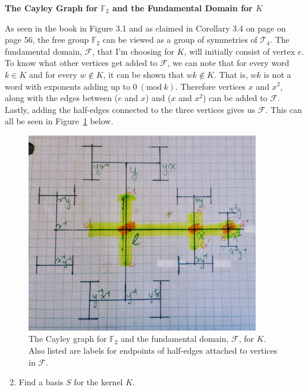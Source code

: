 \documentclass[12pt]{article}%
\newcommand{\F}{\mathbb{F}}
\newcommand{\Mod}[1]{\ (\mathrm{mod}\ #1)}
\begin{document}
\textbf{The Cayley Graph for $\F_2$ and the Fundamental Domain for $K$}

As seen in the book in Figure 3.1 and as claimed in Corollary 3.4 on page on page 56, the free group
$\F_2$ can be viewed as a group of symmetries of $\mathcal{T}_4$. The fundamental domain, $\mathcal{F}$,
that I'm choosing for $K$, will initially consist of vertex $e$. To know what other vertices get added to
$\mathcal{F}$, we can note that for every word $k\in K$ and for every $w\not\in K$, it can be shown that
$wk\not\in K$. That is, $wk$ is not a word with exponents adding up to $0\Mod{k}$. Therefore vertices $x$
and $x^2$, along with the edges between ($e$ and $x$) and ($x$ and $x^2$) can be added to $\mathcal{F}$.
Lastly, adding the half-edges connected to the three vertices gives us $\mathcal{F}$. This can all be seen
in Figure~\ref{fig:fun_domain_of_K} below.

\begin{figure}[ht]
    \centering
    \includegraphics[width=0.9\textwidth]{images/fundamental_domain_for_K.jpg}
    \caption{The Cayley graph for $\F_2$ and the fundamental domain, $\mathcal{F}$, for $K$. Also listed are labels for endpoints of half-edges attached to vertices in $\mathcal{F}$.}
    \label{fig:fun_domain_of_K}
\end{figure}

\begin{enumerate}
  \setcounter{enumi}{1}
  \item Find a basis $S$ for the kernel $K$.
\end{enumerate}
\end{document}
